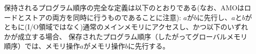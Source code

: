 \newcommand{\ppost}{$b$がストアで$a$と$b$のアクセスメモリアドレスがオーバーラップしている場合}
\newcommand{\ppofence}{$a$のプログラムの順序づけるためのFENCE命令が$b$の前に置かれている場合}
\newcommand{\ppoacquire}{$a$にacquireアノテーションがついている場合}
\newcommand{\pporelease}{$b$にreleaseアノテーションがついている場合}
\newcommand{\pporcsc}{$a$と$b$のどちらにもRCscアノテーションがついている場合}
\newcommand{\ppoamoforward}{$a$はAMOもしくはSCにより生成されたものであり、$b$がロードの場合、$b$は$a$によって書き込まれたものが読み込まれる}
\newcommand{\ppoaddr}{$b$は$a$に対して文法的依存性がある場合}
\newcommand{\ppodata}{$b$は$a$に対して文法的データ依存性がある場合}
\newcommand{\ppoctrl}{$b$はストアで、$b$は$a$に対して文法的制御依存性がある場合}
\newcommand{\ppopair}{$a$は$b$とペアである}
\newcommand{\ppordw}{$a$と$b$がロードであり、$x$は$a$と$b$の両方のバイトを読み、$x$と$a$と$b$のプログラム順の間にストアが存在せず、$a$と$b$は異なるメモリ操作の値$x$を読み出す}
\newcommand{\ppoaddrdatarfi}{$b$はロードであり、プログラム順に$a$と$b$の間に、$m$が$a$にアドレスまたはデータを依存依存性が存在し、$b$が$m$によって書き込まれた値を返すようなストア$m$が存在する。}
\newcommand{\ppoaddrpo}{$b$はストアであり、プログラム順に$a$と$b$の間に$m$という命令が存在し、$m$が$a$にアドレス依存性が存在している。}

\begin{comment}
The complete definition of preserved program order is as follows (and note that AMOs are simultaneously both loads and stores):
memory operation $a$ precedes memory operation $b$ in preserved program order (and hence also in the global memory order) if $a$ precedes $b$ in program order, $a$ and $b$ both access regular main memory (rather than I/O regions), and any of the following hold:
\end{comment}
保持されるプログラム順序の完全な定義は以下のとおりである(なお、AMOはロードとストアの両方を同時に行うものであることに注意):
$a$が$b$に先行し、$a$と$b$がともに(I/O領域ではなく)通常のメインメモリにアクセスし、かつ以下のいずれかが成立する場合、
保存されたプログラム順序（したがってグローバルメモリ順序）では、メモリ操作$a$がメモリ操作$b$に先行する。

